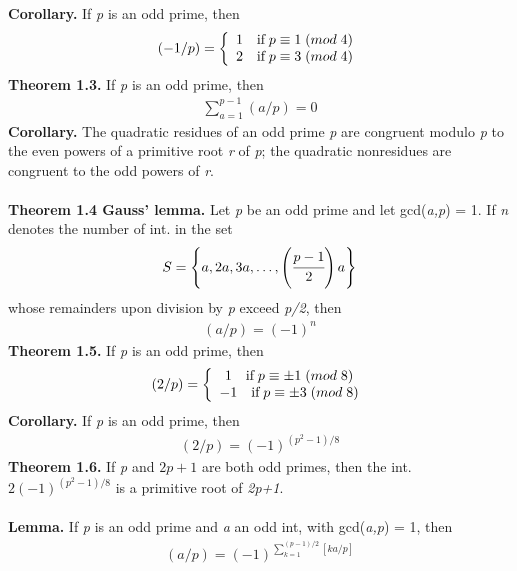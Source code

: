 \documentclass[a4paper,10pt]{article}
\begin{document}
\textbf{Corollary.} If \textit{p} is an odd prime, then
\begin{align}
(-1/p) = \left \{ \begin{array}{cc} 1 \quad \textnormal{if} \; p \equiv 1 \; (mod \; 4) \\ 2 \quad \textnormal{if} \; p \equiv 3 \; (mod \; 4)\end{array} \right.
\end{align}
\textbf{Theorem 1.3.} If \textit{p} is an odd prime, then
\begin{align}
\sum^{p-1}_{a=1}(a/p) = 0
\end{align}
\textbf{Corollary.} The quadratic residues of an odd prime \textit{p} are congruent modulo \textit{p} to the even powers of a primitive root \textit{r} of \textit{p}; the quadratic nonresidues are congruent to the odd powers of \textit{r}. \\ \\
\textbf{Theorem 1.4 Gauss' lemma.} Let \textit{p} be an odd prime and let gcd(\textit{a,p}) = 1. If \textit{n} denotes the number of int. in the set
\begin{align}
S = \left\{ a, 2a, 3a, \ldots, \left( \cfrac{p-1}{2} \right)a \right\}
\end{align}
whose remainders upon division by \textit{p} exceed \textit{p/2}, then
\begin{align}
(a/p) = (-1)^{n}
\end{align}
\textbf{Theorem 1.5.} If \textit{p} is an odd prime, then
\begin{align}
(2/p) = \left \{ \begin{array}{cc} 1 \quad \textnormal{if} \; p \equiv \pm 1 \; (mod \; 8) \\ -1 \quad \textnormal{if} \; p \equiv \pm 3 \; (mod \; 8)\end{array} \right.
\end{align}
\textbf{Corollary.} If \textit{p} is an odd prime, then
\begin{align}
(2/p) = (-1)^{(p^{2}-1)/8}
\end{align}
\textbf{Theorem 1.6.} If \textit{p} and $2p+1$ are both odd primes, then the int. $2(-1)^{(p^{2}-1)/8}$ is a primitive root of \textit{2p+1}. \\ \\
\textbf{Lemma.} If \textit{p} is an odd prime and \textit{a} an odd int, with gcd(\textit{a,p}) = 1, then
\begin{align}
(a/p) = (-1)^{\sum^{(p-1)/2}_{k=1}[ka/p]}
\end{align}
\end{document}
